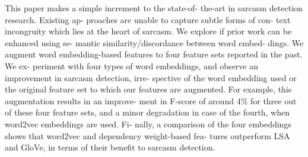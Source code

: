 This paper makes a simple increment to the state-of- the-art in sarcasm detection research. Existing ap- proaches are unable to capture subtle forms of con- text incongruity which lies at the heart of sarcasm. We explore if prior work can be enhanced using se- mantic similarity/discordance between word embed- dings. We augment word embedding-based features to four feature sets reported in the past. We ex- periment with four types of word embeddings, and observe an improvement in sarcasm detection, irre- spective of the word embedding used or the original feature set to which our features are augmented. For example, this augmentation results in an improve- ment in F-score of around 4\% for three out of these four feature sets, and a minor degradation in case of the fourth, when word2vec embeddings are used. Fi- nally, a comparison of the four embeddings shows that word2vec and dependency weight-based fea- tures outperform LSA and GloVe, in terms of their benefit to sarcasm detection.
